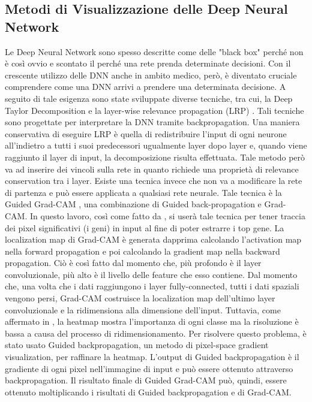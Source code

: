 \subsection{Metodi di Visualizzazione delle Deep Neural Network}
Le Deep Neural Network sono spesso descritte come delle "black box" perché non è così ovvio e scontato il perché una rete
prenda determinate decisioni. Con il crescente utilizzo delle DNN anche in ambito medico, però, è diventato cruciale
comprendere come una DNN arrivi a prendere una determinata decisione.
A seguito di tale esigenza sono state sviluppate diverse tecniche, tra cui, la Deep Taylor Decomposition e la layer-wise
relevance propagation (LRP) \cite{bachdeep, bach2015pixel}. Tali tecniche sono progettate per interpretare la DNN tramite
backpropagation. Una maniera conservativa di eseguire LRP è quella di redistribuire l'input di ogni neurone all'indietro
a tutti i suoi predecessori ugualmente layer dopo layer e, quando viene raggiunto il layer di input, la decomposizione
risulta effettuata. Tale metodo però va ad inserire dei vincoli sulla rete in quanto richiede una proprietà di relevance
conservation tra i layer. 
Esiste una tecnica invece che non va a modificare la rete di partenza e può essere applicata a qualsiasi rete neurale.
Tale tecnica è la Guided Grad-CAM \cite{selvaraju2017grad}, una combinazione di Guided back-propagation e Grad-CAM.
In questo lavoro, così come fatto da \cite{lyu2018deep}, si userà tale tecnica per tener traccia dei pixel significativi
(i geni) in input al fine di poter estrarre i top gene. La localization map di Grad-CAM è generata dapprima calcolando
l'activation map nella forward propagation e poi calcolando la gradient map nella backward propagation. Ciò è così fatto
dal momento che, più profondo è il layer convoluzionale, più alto è il livello delle feature che esso contiene. Dal 
momento che, una volta che i dati raggiungono i layer fully-connected, tutti i dati spaziali vengono persi, Grad-CAM
costruisce la localization map dell'ultimo layer convoluzionale e la ridimensiona alla dimensione dell'input.
Tuttavia, come affermato in \cite{selvaraju2017grad}, la heatmap mostra l'importanza di ogni classe ma la risoluzione 
è bassa a causa del processo di ridimensionamento. Per risolvere questo problema, è stato usato Guided backpropagation,
un metodo di pixel-space gradient visualization, per raffinare la heatmap. L'output di Guided backpropagation è il
gradiente di ogni pixel nell'immagine di input e può essere ottenuto attraverso backpropagation. 
Il risultato finale di Guided Grad-CAM può, quindi, essere ottenuto moltiplicando i risultati di Guided backpropagation 
e di Grad-CAM.